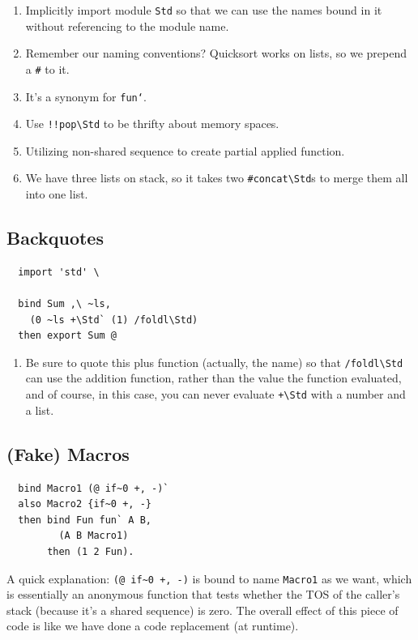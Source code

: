 \documentclass{report}
\newcommand{\mstd}[1]{\texttt{#1\textbackslash Std}}
\begin{document}
\begin{enumerate}
\item Implicitly import module \texttt{Std} so that we can use the names bound in it without referencing to the module name.
\item Remember our naming conventions? Quicksort works on lists, so we prepend a \texttt{\#} to it.
\item It's a synonym for \texttt{fun`}.
\item Use \mstd{!!pop} to be thrifty about memory spaces.
\item Utilizing non-shared sequence to create partial applied function.
\item We have three lists on stack, so it takes two \mstd{\#concat}s to merge them all into one list.
\end{enumerate}

\subsection{Backquotes}
\label{ssec:backquote}
\begin{mdframed}[style=example]
\begin{verbatim}
  import 'std' \

  bind Sum ,\ ~ls,
    (0 ~ls +\Std` (1) /foldl\Std)
  then export Sum @
\end{verbatim}
\end{mdframed}

\begin{enumerate}
\item Be sure to quote this plus function (actually, the name) so that \mstd{/foldl} can use the addition function, rather than the value the function evaluated, and of course, in this case, you can never evaluate \mstd{+} with a number and a list.
\end{enumerate}

\subsection{(Fake) Macros}
\label{ssec:macro}
\begin{mdframed}[style=example]
\begin{verbatim}
  bind Macro1 (@ if~0 +, -)`
  also Macro2 {if~0 +, -}
  then bind Fun fun` A B,
         (A B Macro1)
       then (1 2 Fun).
\end{verbatim}
\end{mdframed}

A quick explanation: \texttt{(@ if\textasciitilde 0 +, -)} is bound to name \texttt{Macro1} as we want, which is essentially an anonymous function that tests whether the TOS of the caller's stack (because it's a shared sequence) is zero. The overall effect of this piece of code is like we have done a code replacement (at runtime).
\end{document}

